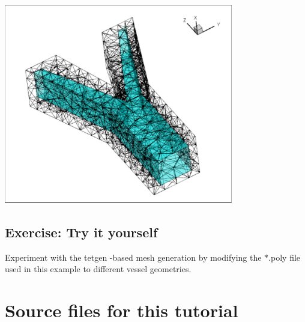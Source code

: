  
\begin{DoxyImage}
\includegraphics[width=0.75\textwidth]{traction_faces}
\end{DoxyImage}




\hypertarget{index_your_own}{}\subsection{Exercise\+: Try it yourself}\label{index_your_own}
Experiment with the {\ttfamily tetgen} -\/based mesh generation by modifying the {\ttfamily $\ast$.poly} file used in this example to different vessel geometries.



 

\hypertarget{index_sources}{}\section{Source files for this tutorial}\label{index_sources}

